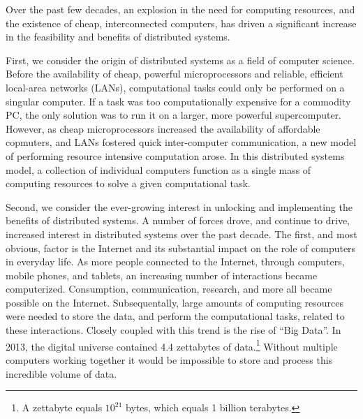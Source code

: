 Over the past few decades, an explosion in the need for computing resources,
and the existence of cheap, interconnected computers, has
driven a significant increase in the feasibility and benefits of distributed
systems.\cite[pg. 1]{distributed-systems-principles-and-paradigms}

First, we consider the origin of distributed systems as a field of computer
science. Before the availability of cheap, powerful microprocessors and reliable,
efficient local-area networks (LANs), computational tasks could only be
performed on a singular computer.\cite[pg.
1]{distributed-systems-principles-and-paradigms} If a task was too
computationally expensive for a commodity PC, the only solution was to run
it on a larger, more powerful supercomputer. However, as cheap microprocessors
increased the availability of affordable copmuters, and LANs fostered quick inter-computer
communication, a new
model of performing resource intensive computation arose.
In this distributed systems model, a collection of individual
computers function as a single mass of computing resources
to solve a given computational task.\cite[pg.
2]{distributed-systems-principles-and-paradigms}

Second, we consider the ever-growing interest in unlocking and implementing the
benefits of distributed systems. A number of forces drove, and continue to drive,
increased interest in distributed systems over
the past decade. The first, and most obvious, factor is the Internet and its
substantial impact on the role of computers in everyday life.
As more people connected to the Internet, through computers,
mobile phones, and tablets, an increasing number of interactions became
computerized. Consumption, communication, research, and more all
became possible on the Internet. Subsequentally, large amounts of computing resources
were needed to store the data, and perform the computational tasks, related to these
interactions. Closely coupled with this trend is the rise of ``Big Data''.
In 2013, the digital universe contained 4.4 zettabytes of data.\footnote{A
  zettabyte equals $10^{21}$ bytes, which equals 1 billion
terabytes.}\cite{the-digital-universe-of-opportunities} Without
multiple computers working together it would be impossible to store and process
this incredible volume of data.

